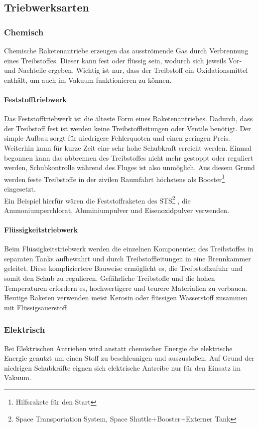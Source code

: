 \documentclass[12pt,a4paper]{article}
\begin{document}
\subsection{Triebwerksarten}
\subsubsection{Chemisch}
Chemische Raketenantriebe erzeugen das ausströmende Gas durch Verbrennung eines Treibstoffes. Dieser kann fest oder flüssig sein, wodurch sich jeweils Vor- und Nachteile ergeben. Wichtig ist nur, dass der Treibstoff ein Oxidationsmittel enthält, um auch im Vakuum funktionieren zu können.
\paragraph{Feststofftriebwerk} 
Das Feststofftriebwerk ist die älteste Form eines Raketenantriebes. Dadurch, dass der Treibstoff fest ist werden keine Treibstoffleitungen oder Ventile benötigt. Der simple Aufbau sorgt für niedrigere Fehlerquoten und einen geringen Preis.  Weiterhin kann für kurze Zeit eine sehr hohe Schubkraft erreicht werden. Einmal begonnen kann das abbrennen des Treibstoffes nicht mehr gestoppt oder reguliert werden, Schubkontrolle während des Fluges ist also unmöglich. Aus diesem Grund werden feste Treibstoffe in der zivilen Raumfahrt höchstens als Booster\footnote{Hilfsrakete für den Start}  eingesetzt.\\
Ein Beispiel hierfür wären die Feststoffraketen des STS\footnote{Space Transportation System, Space Shuttle+Booster+Externer Tank} , die  Ammoniumperchlorat, Aluminiumpulver und Eisenoxidpulver verwenden.
\paragraph{Flüssigkeitstriebwerk}
Beim Flüssigkeitstriebwerk werden die einzelnen Komponenten des Treibstoffes in separaten Tanks aufbewahrt und durch Treibstoffleitungen in eine Brennkammer geleitet. Diese kompliziertere Bauweise ermöglicht es, die Treibstoffzufuhr und somit den Schub zu regulieren. Gefährliche Treibstoffe und die hohen Temperaturen erfordern es, hochwertigere und teurere Materialien zu verbauen.\\
Heutige Raketen verwenden meist Kerosin oder flüssigen Wasserstoff zusammen mit Flüssigsauerstoff.
\subsubsection{Elektrisch}
Bei Elektrischen Antrieben wird anstatt chemischer Energie die elektrische Energie genutzt um einen Stoff zu beschleunigen und auszustoßen. Auf Grund der niedrigen Schubkräfte eignen sich elektrische Antreibe nur für den Einsatz im Vakuum.
\end{document}
